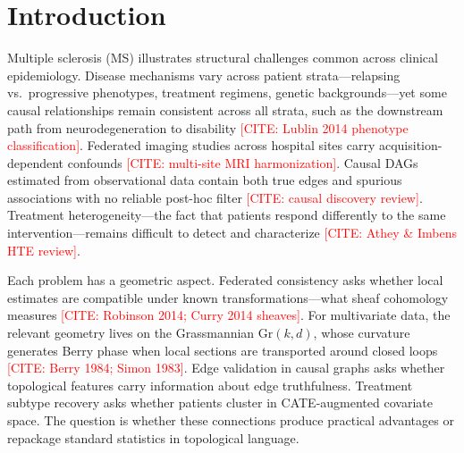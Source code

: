 \documentclass[11pt]{article}
\newcommand{\Gr}{\mathrm{Gr}}
\newcommand{\misscite}[1]{\textcolor{red}{[CITE: #1]}}
\begin{document}
\section{Introduction}
\label{sec:intro}

Multiple sclerosis (MS) illustrates structural challenges common across clinical epidemiology.
Disease mechanisms vary across patient strata---relapsing vs.\ progressive phenotypes, treatment regimens, genetic backgrounds---yet some causal relationships remain consistent across all strata, such as the downstream path from neurodegeneration to disability \misscite{Lublin 2014 phenotype classification}.
Federated imaging studies across hospital sites carry acquisition-dependent confounds \misscite{multi-site MRI harmonization}.
Causal DAGs estimated from observational data contain both true edges and spurious associations with no reliable post-hoc filter \misscite{causal discovery review}.
Treatment heterogeneity---the fact that patients respond differently to the same intervention---remains difficult to detect and characterize \misscite{Athey \& Imbens HTE review}.

Each problem has a geometric aspect.
Federated consistency asks whether local estimates are compatible under known transformations---what sheaf cohomology measures \misscite{Robinson 2014; Curry 2014 sheaves}.
For multivariate data, the relevant geometry lives on the Grassmannian $\Gr(k,d)$, whose curvature generates Berry phase when local sections are transported around closed loops \misscite{Berry 1984; Simon 1983}.
Edge validation in causal graphs asks whether topological features carry information about edge truthfulness.
Treatment subtype recovery asks whether patients cluster in CATE-augmented covariate space.
The question is whether these connections produce practical advantages or repackage standard statistics in topological language.
\end{document}
